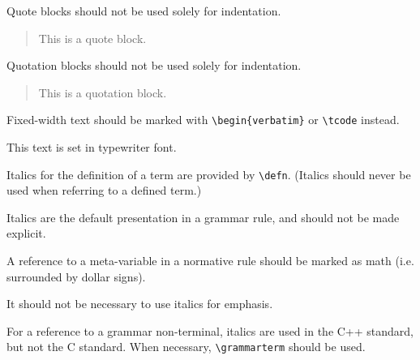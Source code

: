 Quote blocks should not be used solely for indentation.
\begin{quote}
This is a quote block.
\end{quote}

Quotation blocks should not be used solely for indentation.
\begin{quotation}
This is a quotation block.
\end{quotation}

Fixed-width text should be marked with
\verb`\`\verb`begin{verbatim}`
or
\verb`\tcode`
instead.

{\ttfamily
This text is set in typewriter font.
}

Italics for the definition of a term are provided by
\verb`\defn`.
(Italics should never be used when referring to a defined term.)

Italics are the default presentation in a grammar rule,
and should not be made explicit.

A reference to a meta-variable in a normative rule
should be marked as math
(i.e. surrounded by dollar signs).

It should not be necessary to use italics for emphasis.

For a reference to a grammar non-terminal,
italics are used in the C++ standard,
but not the C standard.
When necessary, \verb`\grammarterm` should be used.

